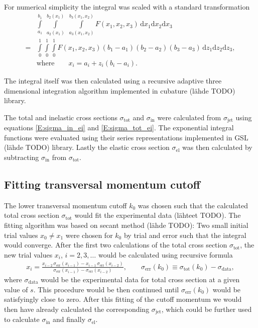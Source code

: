 \documentclass[a4paper, twoside, english, 12pt]{article}
\begin{document}
For numerical simplicity the integral was scaled with a standard transformation
\begin{align}\label{E:integrand_scaling}
	&\int\limits_{a_1}^{b_1} \; \int\limits_{a_2(x_1)}^{b_2(x_1)} \; \int\limits_{a_3(x_1,x_2)}^{b_3(x_1,x_2)} F(x_1,x_2,x_3)\, \text{d}x_1\text{d}x_2\text{d}x_3 \nonumber \\[1em]
	= &\int\limits_{0}^{1}\int\limits_{0}^{1}\int\limits_{0}^{1} F(x_1,x_2,x_3) (b_1-a_1)(b_2-a_2)(b_3-a_3) \, \text{d}z_1\text{d}z_2\text{d}z_3 , \\[1em]
	&\text{where}\qquad x_i = a_i + z_i(b_i-a_i).\nonumber
\end{align}

The integral itself was then calculated using a recursive adaptive three dimensional integration algorithm implemented in cubature (lähde TODO) library.

The total and inelastic cross sections $\sigma_{\text{tot}}$ and $\sigma_{\text{in}}$ were calculated from $\sigma_{\text{jet}}$ using equations \eqref{E:sigma_in_ei} and \eqref{E:sigma_tot_ei}. The exponential integral functions were evaluated using their series representations implemented in GSL (lähde TODO) library. Lastly the elastic cross section $\sigma_{\text{el}}$ was then calculated by subtracting $\sigma_{\text{in}}$ from $\sigma_{\text{tot}}$.



\subsection{Fitting transversal momentum cutoff}

The lower transversal momentum cutoff $k_0$ was chosen such that the calculated total cross section $\sigma_{\text{tot}}$ would fit the experimental data (lähteet TODO). The fitting algorithm was based on secant method (lähde TODO): Two small initial trial values $x_0\neq x_1$ were chosen for $k_0$ by trial and error such that the integral would converge.  After the first two calculations of the total cross section $\sigma_{\text{tot}}$, the new trial values $x_i$, $i=2,3,\ldots$ would be calculated using recursive formula
\begin{align}
	x_i = \frac{x_{i-2}\,\sigma_{\text{err}}(x_{i-1})-x_{i-1}\,\sigma_{\text{err}}(x_{i-2})}{\sigma_{\text{err}}(x_{i-1})-\sigma_{\text{err}}(x_{i-2})}, \qquad \sigma_{\text{err}}(k_0)\equiv \sigma_{\text{tot}}(k_0)-\sigma_{\text{data}},
\end{align}
where $\sigma_{\text{data}}$ would be the experimental data for total cross section at a given value of $s$. This procedure would be then continued until $\sigma_{\text{err}}(k_0)$ would be satisfyingly close to zero. After this fitting of the cutoff momentum we would then have already calculated the corresponding $\sigma_{\text{jet}}$, which could be further used to calculate $\sigma_{\text{in}}$ and finally $\sigma_{\text{el}}$.
\end{document}
